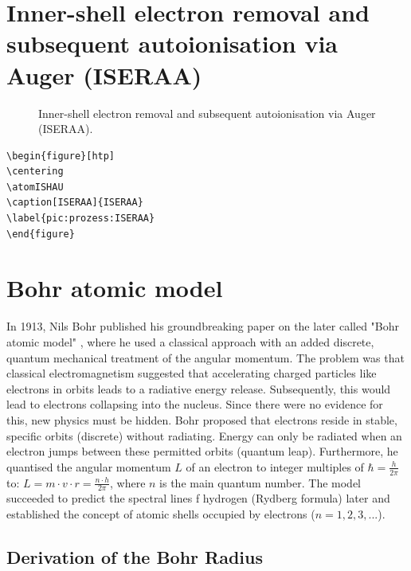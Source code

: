 \documentclass[
	a4paper,
	parskip=half,
    pagesize=auto,      		%
    listof=totoc,   		%
    bibliography=totoc,
	11pt
]{scrartcl}
\begin{document}
\section{Inner-shell electron removal and subsequent autoionisation via Auger (ISERAA)}

\begin{figure}[htp]
\centering
\atomISHAU
\caption[Inner-shell electron removal and subsequent autoionisation via Auger (ISERAA)]{Inner-shell electron removal and subsequent autoionisation via Auger (ISERAA).}
\label{pic:prozess:RE}
\end{figure}

\begin{lstlisting}
\begin{figure}[htp]
\centering
\atomISHAU
\caption[ISERAA]{ISERAA}
\label{pic:prozess:ISERAA}
\end{figure}
\end{lstlisting}


\section{Bohr atomic model}

In 1913, Nils Bohr published his groundbreaking paper on the later called "Bohr atomic model" \cite{bohr1913}, where he used a classical approach with an added discrete, quantum mechanical treatment of the angular momentum. 
The problem was that classical electromagnetism suggested that accelerating charged particles like electrons in orbits leads to a radiative energy release. Subsequently, this would lead to electrons collapsing into the nucleus. 
Since there were no evidence for this, new physics must be hidden. 
Bohr proposed that electrons reside in stable, specific orbits (discrete) without radiating. Energy can only be radiated when an electron jumps between these permitted orbits (quantum leap). 
Furthermore, he quantised the angular momentum $L$ of an electron to integer multiples of $\hbar = \frac{h}{2 \pi}$ to: $L = m \cdot v \cdot r = \frac{n \cdot h}{2 \pi}$, where $n$ is the main quantum number. 
The model succeeded to predict the spectral lines f hydrogen (Rydberg formula) later and established the concept of atomic shells occupied by electrons ($n = 1,2,3,...$).


\subsection{Derivation of the Bohr Radius}
\end{document}
